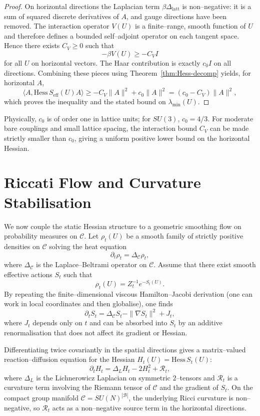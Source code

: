 \documentclass[11pt]{article}
\begin{document}
\begin{proof}
On horizontal directions the Laplacian term $\beta\Delta_{\mathrm{latt}}$
is non--negative: it is a sum of squared discrete derivatives of $A$,
and gauge directions have been removed.  The interaction operator
$V(U)$ is a finite--range, smooth function of $U$ and therefore defines
a bounded self--adjoint operator on each tangent space.  Hence there
exists $C_V\ge 0$ such that
\[
  -\beta V(U) \ge -C_V I
\]
for all $U$ on horizontal vectors.  The Haar contribution is exactly
$c_0 I$ on all directions.  Combining these pieces using
Theorem~\ref{thm:Hess-decomp} yields, for horizontal $A$,
\[
  \langle A,\mathrm{Hess}\,S_{\mathrm{eff}}(U)A\rangle
  \ge -C_V\|A\|^2 + c_0\|A\|^2 = (c_0-C_V)\|A\|^2,
\]
which proves the inequality and the stated bound on $\lambda_{\min}(U)$.
\end{proof}

Physically, $c_0$ is of order one in lattice units; for $SU(3)$,
$c_0=4/3$.  For moderate bare couplings and small lattice spacing, the
interaction bound $C_V$ can be made strictly smaller than $c_0$, giving
a uniform positive lower bound on the horizontal Hessian.

\section{Riccati Flow and Curvature Stabilisation}

We now couple the static Hessian structure to a geometric smoothing
flow on probability measures on $\mathcal{C}$.  Let $\rho_t(U)$ be a
smooth family of strictly positive densities on $\mathcal{C}$ solving
the heat equation
\[
  \partial_t \rho_t = \Delta_{\mathcal{C}}\rho_t,
\]
where $\Delta_{\mathcal{C}}$ is the Laplace--Beltrami operator on
$\mathcal{C}$.  Assume that there exist smooth effective actions $S_t$
such that
\[
  \rho_t(U) = Z_t^{-1}e^{-S_t(U)}.
\]
By repeating the finite--dimensional viscous Hamilton--Jacobi derivation
(one can work in local coordinates and then globalise), one finds
\begin{equation}
  \partial_t S_t = \Delta_{\mathcal{C}}S_t - \|\nabla S_t\|^2 + J_t,
\end{equation}
where $J_t$ depends only on $t$ and can be absorbed into $S_t$ by an
additive renormalisation that does not affect its gradient or Hessian.

Differentiating twice covariantly in the spatial directions gives a
matrix--valued reaction--diffusion equation for the Hessian
$H_t(U)=\mathrm{Hess}\,S_t(U)$:
\begin{equation}
  \partial_t H_t
  = \Delta_L H_t - 2H_t^2 + \mathcal{R}_t,
\end{equation}
where $\Delta_L$ is the Lichnerowicz Laplacian on symmetric $2$--tensors
and $\mathcal{R}_t$ is a curvature term involving the Riemann tensor of
$\mathcal{C}$ and the gradient of $S_t$.  On the compact group manifold
$\mathcal{C}=SU(N)^{|\mathcal{B}|}$, the underlying Ricci curvature is
non--negative, so $\mathcal{R}_t$ acts as a non--negative source term in
the horizontal directions.
\end{document}
